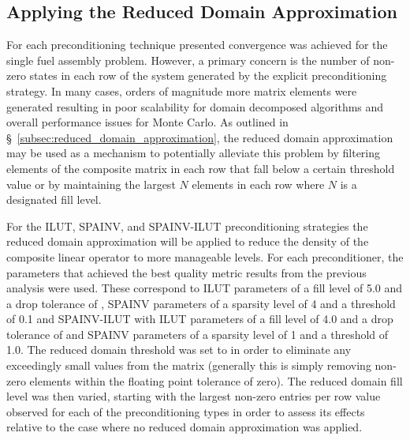 \clearpage

\subsection{Applying the Reduced Domain Approximation}
\label{subsec:spn_prec_rda}
For each preconditioning technique presented convergence was achieved
for the single fuel assembly problem. However, a primary concern is
the number of non-zero states in each row of the system generated by
the explicit preconditioning strategy. In many cases, orders of
magnitude more matrix elements were generated resulting in poor
scalability for domain decomposed algorithms and overall performance
issues for Monte Carlo. As outlined in
\S~\ref{subsec:reduced_domain_approximation}, the reduced domain
approximation may be used as a mechanism to potentially alleviate this
problem by filtering elements of the composite matrix in each row that
fall below a certain threshold value or by maintaining the largest $N$
elements in each row where $N$ is a designated fill level.

For the ILUT, SPAINV, and SPAINV-ILUT preconditioning strategies the
reduced domain approximation will be applied to reduce the density of
the composite linear operator to more manageable levels. For each
preconditioner, the parameters that achieved the best quality metric
results from the previous analysis were used. These correspond to ILUT
parameters of a fill level of 5.0 and a drop tolerance of ,
SPAINV parameters of a sparsity level of 4 and a threshold of 0.1 and
SPAINV-ILUT with ILUT parameters of a fill level of 4.0 and a drop
tolerance of  and SPAINV parameters of a sparsity level of 1
and a threshold of 1.0. The reduced domain threshold was set to
 in order to eliminate any exceedingly small values from
the matrix (generally this is simply removing non-zero elements within
the floating point tolerance of zero). The reduced domain fill level
was then varied, starting with the largest non-zero entries per row
value observed for each of the preconditioning types in order to
assess its effects relative to the case where no reduced domain
approximation was applied.

